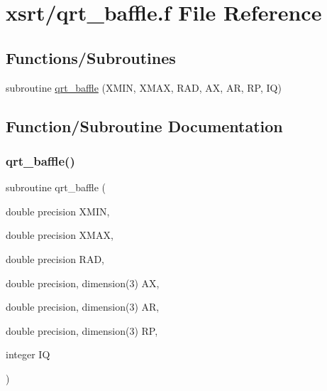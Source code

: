 \hypertarget{qrt__baffle_8f}{}\section{xsrt/qrt\+\_\+baffle.f File Reference}
\label{qrt__baffle_8f}
\subsection*{Functions/\+Subroutines}
\begin{DoxyCompactItemize}
\item 
subroutine \hyperlink{qrt__baffle_8f_a8eb5031e0ae06515c1081f45e7550df1}{qrt\+\_\+baffle} (X\+M\+IN, X\+M\+AX, R\+AD, AX, AR, RP, IQ)
\end{DoxyCompactItemize}


\subsection{Function/\+Subroutine Documentation}
\mbox{\label{qrt__baffle_8f_a8eb5031e0ae06515c1081f45e7550df1}} 
\subsubsection{\texorpdfstring{qrt\+\_\+baffle()}{qrt\_baffle()}}
{\footnotesize\ttfamily subroutine qrt\+\_\+baffle (\begin{DoxyParamCaption}\item[{double precision}]{X\+M\+IN,  }\item[{double precision}]{X\+M\+AX,  }\item[{double precision}]{R\+AD,  }\item[{double precision, dimension(3)}]{AX,  }\item[{double precision, dimension(3)}]{AR,  }\item[{double precision, dimension(3)}]{RP,  }\item[{integer}]{IQ }\end{DoxyParamCaption})}

